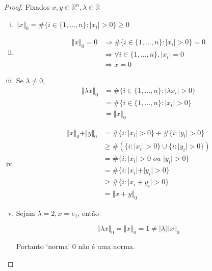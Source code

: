 \begin{proof}
Fixados $x, y \in \mathbb{R}^n, \lambda \in \mathbb{R}$

\begin{enumerate}[(i)]
\item $\Vert x \Vert_0 = \# \lbrace i \in \lbrace 1, \hdots, n \rbrace: \vert x_i \vert > 0 \rbrace \geq 0$
\item \begin{subequations}
\begin{align*}
\Vert x \Vert_0 = 0 &
\Rightarrow \# \lbrace i \in \lbrace 1, \hdots, n \rbrace: \vert x_i \vert > 0 \rbrace = 0 \\
& \Rightarrow \forall i \in \lbrace 1, \hdots, n \rbrace, \vert x_i \vert = 0 \\
& \Rightarrow x = 0
\end{align*}
\end{subequations}

\item Se $\lambda \neq 0$,
\begin{subequations}
\begin{align*}
\Vert \lambda x \Vert_0 & = \# \lbrace i \in \lbrace 1, \hdots, n \rbrace: \vert \lambda x_i \vert > 0 \rbrace \\
& = \# \lbrace i \in \lbrace 1, \hdots, n \rbrace: \vert x_i \vert > 0 \rbrace\\
& = \Vert x \Vert_0
\end{align*}
\end{subequations}

\item
\begin{subequations}
\begin{align*}
\Vert x \Vert_0 + \Vert y \Vert_0 & = \# \lbrace i : \vert x_i \vert > 0 \rbrace
									+ \# \lbrace i : \vert y_i \vert > 0 \rbrace \\
& \geq \#(\lbrace i : \vert x_i \vert > 0 \rbrace \cup \lbrace i : \vert y_i \vert > 0 \rbrace) \\
& = \# \lbrace i : \vert x_i \vert > 0 \textit{ ou } \vert y_i \vert > 0 \rbrace \\
& = \# \lbrace i : \vert x_i \vert + \vert y_i \vert > 0 \rbrace \\
& \geq  \# \lbrace i : \vert x_i + y_i \vert > 0\rbrace \\
& = \Vert x + y \Vert_0
\end{align*}
\end{subequations}

\item Sejam $\lambda = 2, x = e_1$, então

$$ \Vert \lambda x \Vert_0 = \Vert x \Vert_0 = 1 \neq \vert \lambda \vert \Vert x \Vert_0 $$

Portanto `norma' $0$ não é uma norma.
\end{enumerate}
\end{proof}


